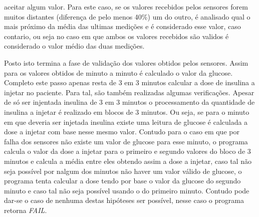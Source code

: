 aceitar algum valor. Para este caso, se os valores recebidos pelos sensores forem muitos distantes (diferença de pelo
menos 40\%) um do outro, é analisado qual o mais próximo da média das ultimas medições e é considerado esse valor, caso
contario, ou seja no caso em que ambos os valores recebidos são validos é considerado o valor médio das duas medições.\par
Posto isto termina a fase de validação dos valores obtidos pelos sensores. Assim para os valores obtidos de minuto a
minuto é calculado o valor da glucose. Completo este passo apenas resta de 3 em 3 minutos calcular a dose de insulina a
injetar no paciente. Para tal, são também realizadas algumas verificações. Apesar de só ser injentada insulina de 3 em
3 minutos o processamento da quantidade de insulina a injetar é realizado em blocos de 3 minutos. Ou seja, se para o
minuto em que deveria ser injetada insulina existe uma leitura de glucose é calculada a dose a injetar com base nesse
mesmo valor. Contudo para o caso em que por falha dos sensores não existe um valor de glucose para esse minuto, o
programa calcula o valor da dose a injetar para o primeiro e segundo valores do bloco de 3 minutos e calcula a média
entre eles obtendo assim a dose a injetar, caso tal não seja possível por nalgum dos minutos não haver um valor válido
de glucose, o programa tenta calcular a dose tendo por base o valor da glucose do segundo minuto e caso tal não seja
possível usando o do primeiro minuto. Contudo pode dar-se o caso de nenhuma destas hipóteses ser possível, nesse caso o
programa retorna \textit{FAIL}.

